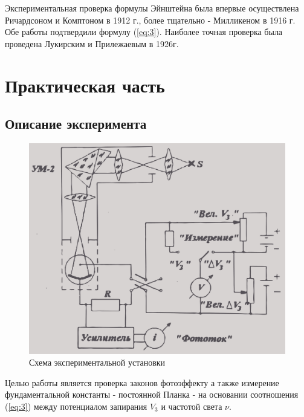 Экспериментальная проверка формулы Эйнштейна была впервые осуществлена Ричардсоном и Комптоном в 1912 г., более тщательно - Милликеном в 1916 г. Обе работы подтвердили формулу (\ref{eq:3}). Наиболее точная проверка была проведена Лукирским и Прилежаевым в 1926г.

\section{Практическая часть}
\subsection{Описание эксперимента}
\begin{figure}[h]
	\centering
	\includegraphics[width=\linewidth]{fig/fig2}
	\caption{Схема экспериментальной установки}
	\label{fig:2}
\end{figure}

Целью работы является проверка законов фотоэффекту а также измерение фундаментальной константы - постоянной Планка - на основании соотношения (\ref{eq:3}) между потенциалом запирания $V_{3}$ и частотой света $\nu$.

